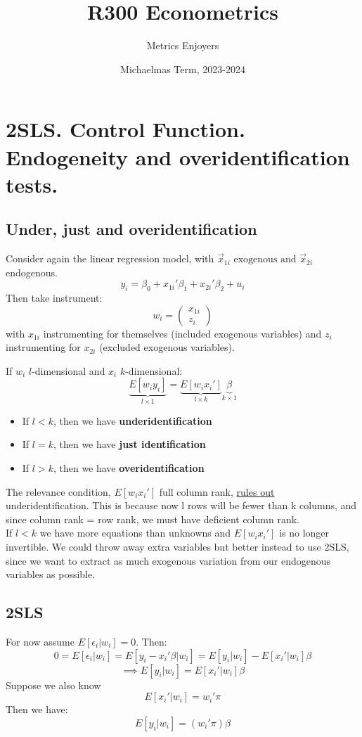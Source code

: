 \documentclass[DIV=14,titlepage=false]{scrreprt}
\title{%
R300 Econometrics}
\author{Metrics Enjoyers}
\date{Michaelmas Term, 2023-2024}
\begin{document}
\chapter{2SLS. Control Function. Endogeneity and overidentification tests.}

\section{Under, just and overidentification}

Consider again the linear regression model, with \(\vec x_{1i} \text{ exogenous and } \vec x_{2i}\) endogenous.
\[y_i = \beta_0 + x_{1i}'\beta_1 + x_{2i}'\beta_2 + u_i\]
Then take instrument:
\[w_i=\begin{pmatrix}x_{1i} \\ z_i\end{pmatrix}\]
with \(x_{1i}\) instrumenting for themselves (included exogenous variables) and \(z_i\) instrumenting for \(x_{2i}\) (excluded exogenous variables). 

If \(w_i\) \(l\)-dimensional and \(x_i\) \(k\)-dimensional:
\[\underbrace{E[w_iy_i]}_{l\times 1} = \underbrace{E[w_ix_i']}_{l\times k}\underbrace{\beta}_{k\times 1}\]
\begin{itemize}
\item If \(l<k\), then we have \textbf{underidentification}
\item If \(l=k\), then we have \textbf{just identification}
\item If \(l>k\), then we have \textbf{overidentification}
\end{itemize} 

The relevance condition, \(E[w_ix_i']\) full column rank, \underline{rules out} underidentification. This is because now l rows will be fewer than k columns, and since column rank = row rank, we must have deficient column rank.
\\ If \(l<k\) we have more equations than unknowns and \(E[w_ix_i']\) is no longer invertible. We could throw away extra variables but better instead to use 2SLS, since we want to extract as much exogenous variation from our endogenous variables as possible.

\section{2SLS}

For now assume \(E[\epsilon_i|w_i]=0\). Then:
\[0=E[\epsilon_i|w_i]=E[y_i-x_i'\beta|w_i]=E[y_i|w_i]-E[x_i'|w_i]\beta\]
\[\implies E[y_i|w_i]=E[x_i'|w_i]\beta\]
Suppose we also know
\[E[x_i'|w_i]=w_i'\pi\]
Then we have:
\[E[y_i|w_i]=(w_i'\pi)\beta\]
\end{document}
